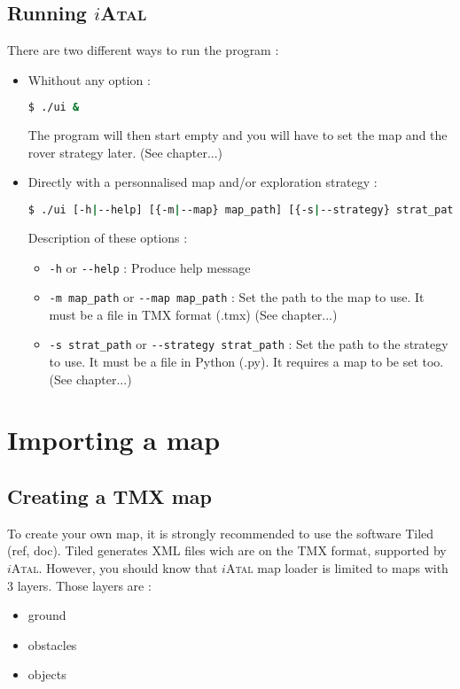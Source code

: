 \documentclass[a4paper,11pt]{article}
\newcommand\iAtal{$i$\textsc{Atal}}
\begin{document}
\subsection{Running \iAtal{}}
There are two different ways to run the program :
\begin{itemize}
\item Whithout any option :
\begin{lstlisting}[language=sh]
$ ./ui &
\end{lstlisting}
  The program will then start empty and you will have to set the map
  and the rover strategy later. (See chapter...)
  
\item Directly with a personnalised map and/or exploration strategy :
\begin{lstlisting}[language=sh]
$ ./ui [-h|--help] [{-m|--map} map_path] [{-s|--strategy} strat_path]
\end{lstlisting}
  Description of these options :
  \begin{itemize}
  \item \verb!-h! or \verb!--help! : Produce help message
  \item \verb!-m map_path! or \verb!--map map_path! : Set the path to
    the map to use. It must be a file in TMX format (.tmx) (See
    chapter...)
  \item \verb!-s strat_path! or \verb!--strategy strat_path! : Set the
    path to the strategy to use. It must be a file in Python (.py). It
    requires a map to be set too. (See chapter...)
  \end{itemize}
\end{itemize}

\section{Importing a map}

\subsection{Creating a TMX map}

To create your own map, it is strongly recommended to use the software
Tiled (ref, doc).  Tiled generates XML files wich are on the TMX
format, supported by \iAtal{}. However, you should know that \iAtal{} map
loader is limited to maps with 3 layers. Those layers are :
\begin{itemize}
\item ground
\item obstacles
\item objects
\end{itemize}
\label{avaibleLayers}
\end{document}
